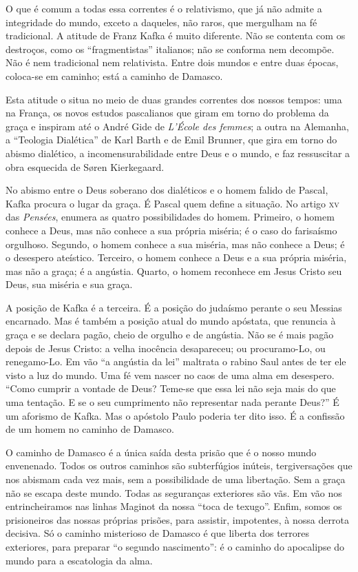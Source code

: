 O que é comum a todas
essa correntes é o relativismo, que já não admite a integridade do
mundo, exceto a daqueles, não raros, que mergulham na fé tradicional.
A atitude de Franz Kafka é muito diferente. Não se contenta com os
destroços, como os ``fragmentistas'' italianos; não se conforma nem
decompõe. Não é nem tradicional nem relativista. Entre dois mundos e
entre duas épocas, coloca-se em caminho; está a caminho de Damasco.

Esta atitude o situa no meio de duas grandes correntes dos nossos tempos: uma
na França, os novos estudos pascalianos que giram em torno do problema da
graça e inspiram até o André Gide de \textit{L'École des femmes}; a outra na
Alemanha, a ``Teologia Dialética'' de Karl Barth e de Emil Brunner,
que gira em torno do abismo dialético, a incomensurabilidade entre Deus
e o mundo, e faz ressuscitar a obra esquecida de Søren Kierkegaard.

No abismo entre o Deus soberano dos dialéticos e o homem falido de Pascal, Kafka procura o lugar da graça. É Pascal quem define a situação. No
artigo \textsc{xv} das \textit{Pensées}, enumera as quatro possibilidades do homem. Primeiro, o homem
conhece
a Deus, mas não conhece a sua própria miséria; é o caso do farisaísmo
orgulhoso. Segundo, o homem conhece a sua miséria, mas não conhece a
Deus; é o desespero ateístico. Terceiro, o homem conhece a Deus e a
sua própria miséria, mas não a graça; é a angústia. Quarto, o homem
reconhece em Jesus Cristo seu Deus, sua miséria e sua graça.

A posição de Kafka é a terceira. É a posição do judaísmo perante o seu Messias
encarnado. Mas é também a posição atual do mundo apóstata, que renuncia
à graça e se declara pagão, cheio de orgulho e de angústia. Não se é
mais pagão depois de Jesus Cristo: a velha inocência desapareceu; ou
procuramo-Lo, ou renegamo-Lo. Em vão ``a angústia da lei'' maltrata o
rabino Saul antes de ter ele visto a luz do mundo. Uma fé vem nascer no
caos de uma alma em desespero. ``Como cumprir a vontade de Deus? Teme-se
que essa lei não seja mais do que uma tentação. E se o seu cumprimento
não representar nada perante Deus?'' É um aforismo de Kafka.
Mas o apóstolo Paulo poderia ter dito isso. É a confissão de um homem no caminho de Damasco.

O caminho de Damasco é a única saída desta prisão que é o nosso mundo envenenado. Todos os outros caminhos são subterfúgios inúteis, tergiversações que nos abismam cada vez mais, sem a possibilidade de uma libertação.
Sem a graça não se escapa deste mundo. Todas as seguranças exteriores são vãs.
Em vão nos entrincheiramos nas linhas Maginot da nossa ``toca de texugo''.
Enfim, somos os prisioneiros das nossas próprias prisões, para assistir, impotentes, à
nossa derrota decisiva. Só o caminho misterioso de Damasco é que liberta dos terrores exteriores,
para preparar ``o segundo nascimento'': é o caminho do apocalipse do
mundo para a escatologia da alma.

